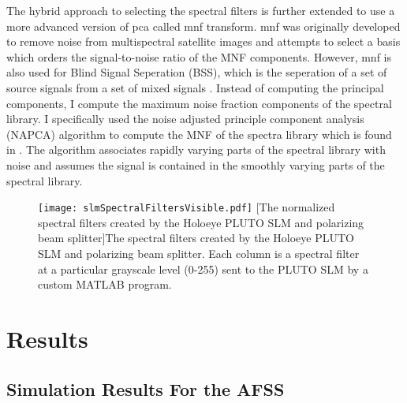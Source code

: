 The hybrid approach to selecting the spectral filters is further extended to use a more advanced version of \gls{pca} called \acrfull{mnf} transform. \gls{mnf} was originally developed to remove noise from multispectral satellite images \cite{green1988transformation} and attempts to select a basis which orders the signal-to-noise ratio of the MNF components. However, \gls{mnf} is also used for Blind Signal Seperation (BSS), which is the seperation of a set of source signals from a set of mixed signals \cite{hundley2001solution}. Instead of computing the principal components, I compute the maximum noise fraction components of the spectral library. I specifically used the noise adjusted principle component analysis (NAPCA) algorithm to compute the MNF of the spectra library which is found in \cite{hundley2001solution}. The algorithm associates rapidly varying parts of the spectral library with noise and assumes the signal is contained in the smoothly varying parts of the spectral library. 

\begin{figure}[H]
	\centering
	\texttt{[image: slmSpectralFiltersVisible.pdf]}
	[The normalized spectral filters created by the Holoeye PLUTO SLM and polarizing beam splitter]{The spectral filters created by the Holoeye PLUTO SLM and polarizing beam splitter. Each column is a spectral filter at a particular grayscale level (0-255) sent to the PLUTO SLM by a custom MATLAB program. }
	\label{fig:slmSpectralFiltersVisible}
\end{figure}


\section{Results}

\subsection{Simulation Results For the AFSS}


